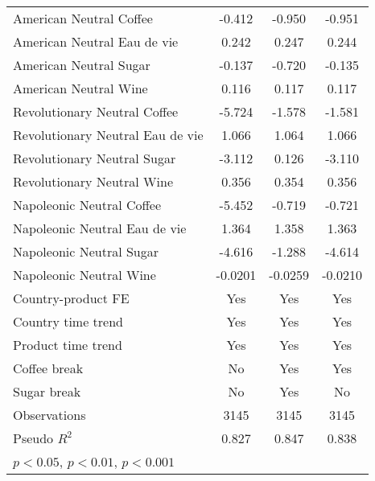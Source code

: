 \begin{table}[htbp]
\begin{tabular}{l*{3}{c}}
American Neutral Coffee&      -0.412         &      -0.950\sym{***}&      -0.951\sym{***}\\
American Neutral Eau de vie&       0.242         &       0.247         &       0.244         \\
American Neutral Sugar&      -0.137         &      -0.720\sym{***}&      -0.135         \\
American Neutral Wine&       0.116         &       0.117         &       0.117         \\
Revolutionary Neutral Coffee&      -5.724\sym{***}&      -1.578         &      -1.581         \\
Revolutionary Neutral Eau de vie&       1.066\sym{***}&       1.064\sym{***}&       1.066\sym{***}\\
Revolutionary Neutral Sugar&      -3.112\sym{***}&       0.126         &      -3.110\sym{***}\\
Revolutionary Neutral Wine&       0.356\sym{*}  &       0.354\sym{*}  &       0.356\sym{*}  \\
Napoleonic Neutral Coffee&      -5.452\sym{***}&      -0.719         &      -0.721         \\
Napoleonic Neutral Eau de vie&       1.364\sym{***}&       1.358\sym{***}&       1.363\sym{***}\\
Napoleonic Neutral Sugar&      -4.616\sym{***}&      -1.288         &      -4.614\sym{***}\\
Napoleonic Neutral Wine&     -0.0201         &     -0.0259         &     -0.0210         \\
Country-product FE  &         Yes         &         Yes         &         Yes         \\
Country time trend  &         Yes         &         Yes         &         Yes         \\
Product time trend  &         Yes         &         Yes         &         Yes         \\
Coffee break        &          No         &         Yes         &         Yes         \\
Sugar break         &          No         &         Yes         &          No         \\
\hline
Observations        &        3145         &        3145         &        3145         \\
Pseudo \(R^{2}\)    &       0.827         &       0.847         &       0.838         \\
\hline\hline
\multicolumn{4}{l}{\footnotesize \sym{*} \(p<0.05\), \sym{**} \(p<0.01\), \sym{***} \(p<0.001\)}\\
\end{tabular}
\end{table}

